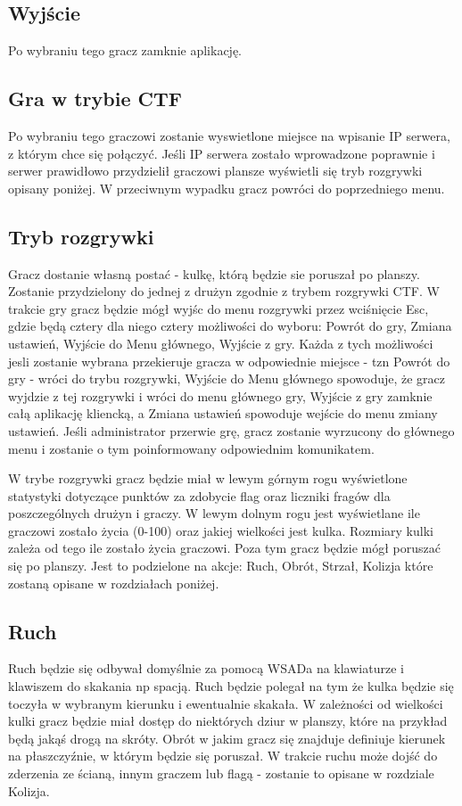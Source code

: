 \documentclass[12pt,a4paper,twoside]{article}
\begin{document}
\subsection{Wyjście}
Po wybraniu tego gracz zamknie aplikację.

\subsection{Gra w trybie CTF}
Po wybraniu tego graczowi zostanie wyswietlone miejsce na wpisanie IP serwera, z którym chce się połączyć. Jeśli IP serwera zostało wprowadzone poprawnie i serwer prawidłowo przydzielił graczowi plansze wyświetli się tryb rozgrywki opisany poniżej. W przeciwnym wypadku gracz powróci do poprzedniego menu.

\subsection{Tryb rozgrywki}
Gracz dostanie własną postać - kulkę, którą będzie sie poruszał po planszy. Zostanie przydzielony do jednej z drużyn zgodnie z trybem rozgrywki CTF. W trakcie gry gracz będzie mógł wyjśc do menu rozgrywki przez wciśnięcie Esc, gdzie będą cztery dla niego cztery możliwości do wyboru: Powrót do gry, Zmiana ustawień, Wyjście do Menu głównego, Wyjście z gry. Każda z tych możliwości jesli zostanie wybrana przekieruje gracza w odpowiednie miejsce - tzn Powrót do gry - wróci do trybu rozgrywki, Wyjście do Menu głównego spowoduje, że gracz wyjdzie z tej rozgrywki i wróci do menu głównego gry, Wyjście z gry zamknie całą aplikację kliencką, a Zmiana ustawień spowoduje wejście do menu zmiany ustawień. Jeśli administrator przerwie grę, gracz zostanie wyrzucony do głównego menu i zostanie o tym poinformowany odpowiednim komunikatem.

W trybe rozgrywki gracz będzie miał w lewym górnym rogu wyświetlone statystyki dotyczące punktów za zdobycie flag oraz liczniki fragów dla poszczególnych drużyn i graczy. W lewym dolnym rogu jest wyświetlane ile graczowi zostało życia (0-100) oraz jakiej wielkości jest kulka. Rozmiary kulki zależa od tego ile zostało życia graczowi. Poza tym gracz będzie mógł poruszać się po planszy. Jest to podzielone na akcje: Ruch, Obrót, Strzał, Kolizja które zostaną opisane w rozdziałach poniżej.

\subsection{Ruch}
Ruch będzie się odbywał domyślnie za pomocą WSADa na klawiaturze i klawiszem do skakania np spacją. Ruch będzie polegał na tym że kulka będzie się toczyła w wybranym kierunku i ewentualnie skakała. W zależności od wielkości kulki gracz będzie miał dostęp do niektórych dziur w planszy, które na przykład będą jakąś drogą na skróty. Obrót w jakim gracz się znajduje definiuje kierunek na płaszczyźnie, w którym będzie się poruszał. W trakcie ruchu może dojść do zderzenia ze ścianą, innym graczem lub flagą - zostanie to opisane w rozdziale Kolizja.
\end{document}
